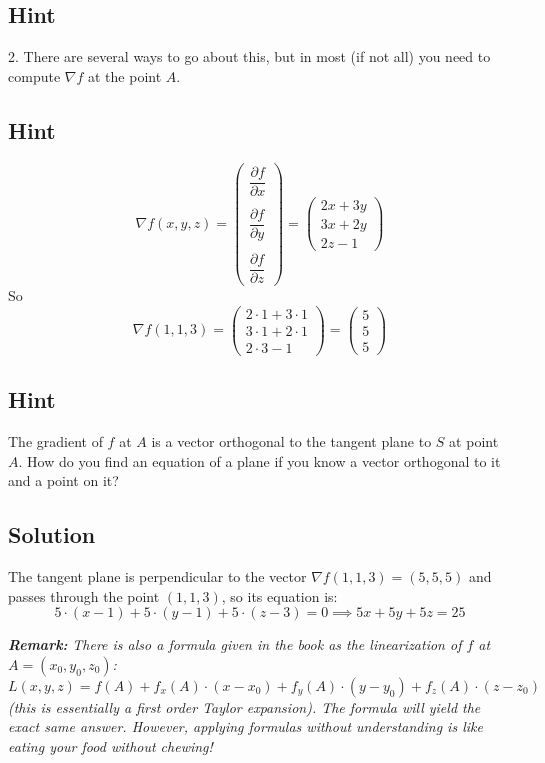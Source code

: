 \documentclass[a4paper,10pt]{article}
\begin{document}
\subsection{Hint}
2. There are several ways to go about this, but in most (if not all) you need to compute $\nabla f$ at the point $A$.

\subsection{Hint}
\[
    \nabla f(x,y,z) = \begin{pmatrix}
        \dfrac{\partial f}{\partial x} \\ \\ \dfrac{\partial f}{\partial y} \\ \\ \dfrac{\partial f}{\partial z}
    \end{pmatrix} = \begin{pmatrix}
        2x+3y \\ 3x+2y \\ 2z-1
    \end{pmatrix}
\]
So
\[
    \nabla f(1,1,3) = \begin{pmatrix}
        2\cdot 1+3\cdot 1 \\ 3\cdot 1+2\cdot 1 \\ 2\cdot 3-1
    \end{pmatrix} = \begin{pmatrix}
        5 \\ 5 \\ 5
    \end{pmatrix}
\]

\subsection{Hint}
The gradient of $f$ at $A$ is a vector orthogonal to the tangent plane to $S$ at point $A$. How do you find an equation of a plane if you know a vector orthogonal to it and a point on it?

\subsection{Solution}
The tangent plane is perpendicular to the vector $\nabla f(1, 1, 3) = (5, 5, 5)$ and passes through the point $(1, 1, 3)$, so its equation is:
\[
    5\cdot(x-1) + 5\cdot (y-1) + 5 \cdot (z-3) = 0 \implies 5x+5y+5z = 25
\]

\textbf{\emph{Remark:}} \emph{There is also a formula given in the book as the linearization of $f$ at $A = (x_0, y_0, z_0)$:
    \[
        L(x,y,z) = f(A) + f_x(A)\cdot (x - x_0) + f_y(A)\cdot (y - y_0) + f_z(A)\cdot (z - z_0)
    \]
    (this is essentially a first order Taylor expansion). The formula will yield the exact same answer. However, applying formulas without understanding is like eating your food without chewing!}
\end{document}
